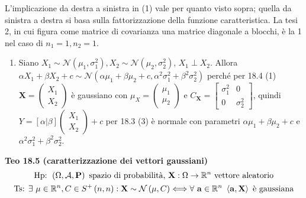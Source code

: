 \documentclass{article}
\begin{document}
L'implicazione da destra a sinistra in (1) vale per quanto visto sopra;
quella da sinistra a destra si basa sulla fattorizzazione della funzione
caratteristica. La tesi 2, in cui figura come matrice di covarianza una
matrice diagonale a blocchi, \`{e} la 1 nel caso di $n_{1}=1,n_{2}=1$.

\begin{enumerate}
\item Siano $X_{1}\sim \mathcal{N}\left( \mu _{1},\sigma _{1}^{2}\right)
,X_{2}\sim \mathcal{N}\left( \mu _{2},\sigma _{2}^{2}\right) $, $X_{1}\perp
X_{2}$. Allora $\alpha X_{1}+\beta X_{2}+c\sim \mathcal{N}\left( \alpha \mu
_{1}+\beta \mu _{2}+c,\alpha ^{2}\sigma _{1}^{2}+\beta ^{2}\sigma
_{2}^{2}\right) $ perch\'{e} per 18.4 (1) $\mathbf{X=}\left( 
\begin{array}{c}
X_{1} \\ 
X_{2}%
\end{array}%
\right) $ \`{e} gaussiano con $\mu _{X}=\left( 
\begin{array}{c}
\mu _{1} \\ 
\mu _{2}%
\end{array}%
\right) $ e $C_{\mathbf{X}}=\left[ 
\begin{array}{cc}
\sigma _{1}^{2} & 0 \\ 
0 & \sigma _{2}^{2}%
\end{array}%
\right] $, quindi $Y=\left[ \alpha |\beta \right] \left( 
\begin{array}{c}
X_{1} \\ 
X_{2}%
\end{array}%
\right) +c$ per 18.3 (3) \`{e} normale con parametri $\alpha \mu _{1}+\beta
\mu _{2}+c$ e $\alpha ^{2}\sigma _{1}^{2}+\beta ^{2}\sigma _{2}^{2}$.
\end{enumerate}

\textbf{Teo 18.5 (caratterizzazione dei vettori gaussiani)}%
\begin{gather*}
\text{Hp}\text{: }\left( \Omega ,\mathcal{A},\mathbf{P}\right) \text{ spazio
di probabilit\`{a}, }\mathbf{X}:\Omega \rightarrow 
\mathbb{R}
^{n}\text{ vettore aleatorio} \\
\text{Ts}\text{: }\exists \text{ }\mathbf{\mu }\in 
\mathbb{R}
^{n},C\in S^{+}\left( n,n\right) :\mathbf{X}\sim \mathcal{N}\left( \mathbf{%
\mu },C\right) \Longleftrightarrow \forall \text{ }\mathbf{a}\in 
\mathbb{R}
^{n}\text{ }\left\langle \mathbf{a,X}\right\rangle \text{ \`{e} gaussiana}
\end{gather*}
\end{document}
